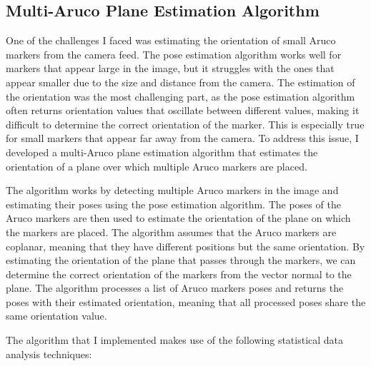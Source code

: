 
\subsection{Multi-Aruco Plane Estimation Algorithm}

One of the challenges I faced was estimating the orientation of small Aruco markers from the camera feed.
The pose estimation algorithm works well for markers that appear large in the image, but it struggles with
the ones that appear smaller due to the size and distance from the camera. The estimation of the orientation
was the most challenging part, as the pose estimation algorithm often returns orientation values that
oscillate between different values, making it difficult to determine the correct orientation of the marker.
This is especially true for small markers that appear far away from the camera. To address this issue,
I developed a multi-Aruco plane estimation algorithm that estimates the orientation of a plane over which
multiple Aruco markers are placed.

The algorithm works by detecting multiple Aruco markers in the image and estimating their poses using the pose
estimation algorithm. The poses of the Aruco markers are then used to estimate the orientation of the plane
on which the markers are placed. The algorithm assumes that the Aruco markers are coplanar, meaning that 
they have different positions but the same orientation. By estimating the orientation of the plane that passes
through the markers, we can determine the correct orientation of the markers from the vector normal
to the plane. The algorithm processes a list of Aruco markers poses and returns the poses with their
estimated orientation, meaning that all processed poses share the same orientation value.

The algorithm that I implemented makes use of the following statistical data analysis techniques:

